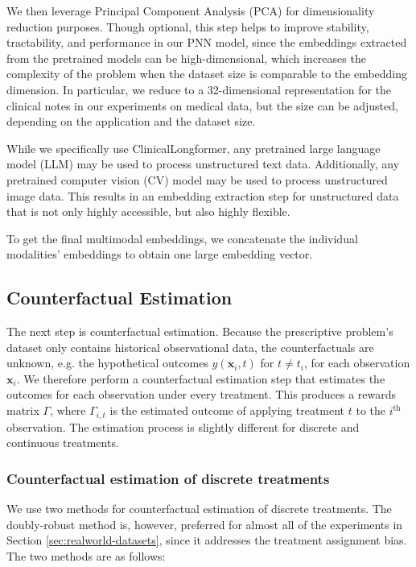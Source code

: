 \documentclass[10pt]{article} %
\begin{document}
We then leverage Principal Component Analysis (PCA) for dimensionality reduction purposes. Though optional, this step helps to improve stability, tractability, and performance in our PNN model, since the embeddings extracted from the pretrained models can be high-dimensional,  which increases the complexity of the problem when the dataset size is comparable to the embedding dimension. In particular, we reduce to a 32-dimensional representation for the clinical notes in our experiments on medical data, but the size can be adjusted, depending on the application and the dataset size.

While we specifically use ClinicalLongformer, any pretrained large language model (LLM) may be used to process unstructured text data. Additionally, any pretrained computer vision (CV) model may be used to process unstructured image data. This results in an embedding extraction step for unstructured data that is not only highly accessible, but also highly flexible.

To get the final multimodal embeddings, we concatenate the individual modalities' embeddings to obtain one large embedding vector.

\subsection{Counterfactual Estimation}\label{subsec:counterfactual-estimation}
The next step is counterfactual estimation. Because the prescriptive problem's dataset only contains historical observational data, the counterfactuals are unknown, e.g. the hypothetical outcomes $y(\boldsymbol{x}_i, t)$ for $t \neq t_{i}$, for each observation $\boldsymbol{x}_i$. We therefore perform a counterfactual estimation step \citep{doubly-robust-policy} that estimates the outcomes for each observation under every treatment. This produces a rewards matrix $\Gamma$, where $\Gamma_{i,t}$ is the estimated outcome of applying treatment $t$ to the $i^{\text{th}}$ observation. The estimation process is slightly different for discrete and continuous treatments.

\subsubsection{Counterfactual estimation of discrete treatments}\label{subsubsec:counterfactual-estimation-discrete}

We use two methods for counterfactual estimation of discrete treatments. The doubly-robust method is, however, preferred for almost all of the experiments in Section \ref{sec:realworld-datasets}, since it addresses the treatment assignment bias. The two methods are as follows:
\end{document}
